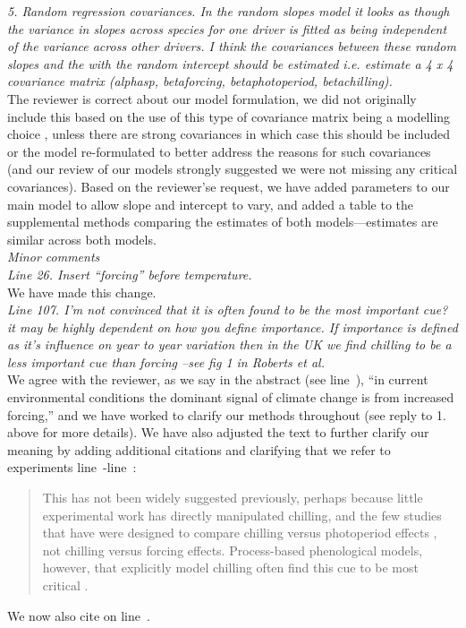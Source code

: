 \documentclass[11pt, a4paper]{article}
\newcommand{\lr}[1]{line~\lineref{#1}}
\begin{document}
\emph{5. Random regression covariances. In the random slopes model it looks as though the variance in
slopes across species for one driver is fitted as being independent of the variance across other
drivers. I think the covariances between these random slopes and the with the random
intercept should be estimated i.e. estimate a 4 x 4 covariance matrix (alphasp, betaforcing,
betaphotoperiod, betachilling).}\\

The reviewer is correct about our model formulation, we did not originally include this based on the use of this type of covariance matrix being a modelling choice \citep{gelman2006}, unless there are strong covariances in which case this should be included or the model re-formulated to better address the reasons for such covariances (and our review of our models strongly suggested we were not missing any critical covariances). Based on the reviewer'se request, we have added parameters to our main model to allow slope and intercept to vary, and added a table to the supplemental methods comparing the estimates of both models---estimates are similar across both models.\\ %

\emph{Minor comments}\\

\emph{Line 26. Insert ``forcing'' before temperature.}\\

We have made this change.\\ %

\emph{Line 107. I'm not convinced that it is often found to be the most important cue? it may be highly
dependent on how you define importance. If importance is defined as it's influence on year to year
variation then in the UK we find chilling to be a less important cue than forcing --see fig 1 in Roberts et
al.}\\

We agree with the reviewer, as we say in the abstract (see \lr{unifydebateend}), ``in current environmental conditions the dominant signal of climate change is from increased forcing,'' and we have worked to clarify our methods throughout (see reply to 1. above for more details). We have also adjusted the text to further clarify our meaning by adding additional citations and clarifying that we refer to experiments \lr{eeXstart}-\lr{eeXend}:
\begin{quote}
This has not been widely suggested previously, perhaps because little experimental work has directly manipulated chilling, and the few studies that have were designed to compare chilling versus photoperiod effects \emph{\citep[e.g.,][]{zohner2016,Basler:2014aa,Caffarra:2011qf,Laube:2014a}}, not chilling versus forcing effects. Process-based phenological models, however, that explicitly model chilling often find this cue to be most critical \emph{\citep[e.g.,][]{gauzere2019,Laube:2014a,Heide:2005aa}}.
\end{quote}
We now also cite \citet{roberts2015} on \lr{addedroberts}.\\
\end{document}
